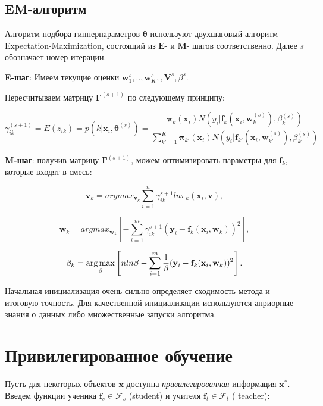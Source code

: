 \documentclass[12pt,twoside]{article}
\begin{document}
\subsection{EM-алгоритм}
Алгоритм подбора гипперпараметров $\boldsymbol{\theta}$ используют двухшаговый алгоритм Expectation-Maximization, состоящий из $\mathbf{E}$- и $\mathbf{M}$- шагов соответственно. Далее $s$ обозначает номер итерации.

\textbf{E-шаг}: Имеем текущие оценки $\mathbf{w}_1^s, .. , \mathbf{w}_K^s, , \mathbf{V}^s, \mathbb{\beta}^s $. 

Пересчитываем матрицу $\boldsymbol{\Gamma}^{(s + 1)}$ по следующему принципу:

$$ \gamma_{ik}^{(s+1)} = E(z_{ik}) = p(k | \mathbf{x}_i, \boldsymbol{\theta}^{(s)}) = 
\frac{\boldsymbol{\pi}_k(\mathbf{x}_i) N(y_i | \mathbf{f}_k(\mathbf{x}_i, \mathbf{w}_k^{(s)}), \beta_k^{(s)})}
{\sum\limits_{k'=1}^K\boldsymbol{\pi}_{k'}(\mathbf{x}_i) N(y_i | \mathbf{f}_{k'}(\mathbf{x}_i, \mathbf{w}_{k'}^{(s)}), \beta_{k'}^{(s)})}$$

\textbf{M-шаг}: получив матрицу $\boldsymbol{\Gamma}^{(s + 1)}$, можем оптимизировать параметры для $\mathbf{f}_k$, которые входят в смесь:

$$ \mathbf{v}_k = argmax_{\mathbf{v}_k} \sum\limits_{i=1}^{n} \gamma_{ik}^{s+1} ln \pi_k (\mathbf{x}_i, \mathbf{v}),$$

$$ \mathbf{w}_k = argmax_{\mathbf{w}_k} \left[   -\sum\limits_{i=1}^m \gamma_{ik}^{s+1} (  \mathbf{y}_i - \mathbf{f}_k (\mathbf{x}_i,
 \mathbf{w}_k)   )^2               \right],$$

$$ \beta_k = \argmax_\beta  \left[  n ln \beta - \sum\limits_{i=1}^m \frac{1}{\beta}  
 (\mathbf{y}_i -  \mathbf{f}_k (\mathbf{x}_i, \mathbf{w}_k)   )^2
  \right].$$

Начальная инициализация очень сильно определяет сходимость метода и итоговую точность. Для качественной инициализации используются априорные знания о данных либо множественные запуски алгоритма.

\section{Привилегированное обучение}

Пусть для некоторых объектов $\mathbf{x}$ доступна \emph{привилегированная} информация $\mathbf{x}^*$. Введем функции ученика $\mathbf{f}_s  \in \mathcal{F}_s$ (student) и учителя $\mathbf{f}_t \in \mathcal{F}_t$ ( teacher):
\end{document}
